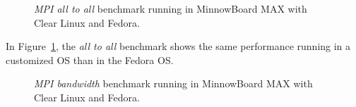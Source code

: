 \begin{figure}[H]
\begin{center}
\end{center}
\caption{\textit{MPI all to all} benchmark running in MinnowBoard MAX with Clear Linux and
Fedora.}
\label{mpi_alltoall_clr_fedora}
\end{figure}

In Figure~\ref{mpi_alltoall_clr_fedora}, the \textit{all to all} benchmark
shows the same performance running in a customized OS than in the Fedora OS. 

\begin{figure}[H]
\begin{center}
\end{center}
\caption{\textit{MPI bandwidth} benchmark running in MinnowBoard MAX with Clear Linux and
Fedora.}
\label{mpi_bandwidth_clr_fedora}
\end{figure}

